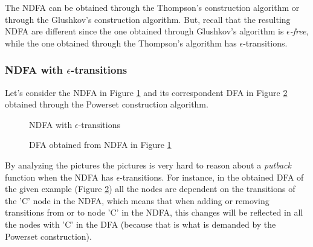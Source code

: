 The NDFA can be obtained through the Thompson's construction algorithm or through the Glushkov's construction algorithm. But, recall that the resulting NDFA are different since the one obtained through Glushkov's algorithm is \textit{$\epsilon$-free}, while the one obtained through the Thompson's algorithm has $\epsilon$-transitions. 

\subsubsection{NDFA with $\epsilon$-transitions}
Let's consider the NDFA in Figure \ref{fig:epsilon} and its correspondent DFA in Figure \ref{fig:epsilondfa} obtained through the Powerset construction algorithm. 

\begin{figure}
    \centering
    \caption{NDFA with $\epsilon$-transitions}
    \label{fig:epsilon}
\end{figure}

\begin{figure}
    \centering
    \caption{DFA obtained from NDFA in Figure \ref{fig:epsilon}}
    \label{fig:epsilondfa}
\end{figure}

By analyzing  the pictures the pictures is very hard to reason about a \textit{putback} function when the NDFA has $\epsilon$-transitions. For instance, in the obtained DFA of the given example (Figure \ref{fig:epsilondfa}) all the nodes are dependent on the transitions of the 'C' node in the NDFA, which means that when adding or removing transitions from or to node 'C' in the NDFA, this changes will be reflected in all the nodes with 'C' in the DFA (because that is what is demanded by the Powerset construction).

